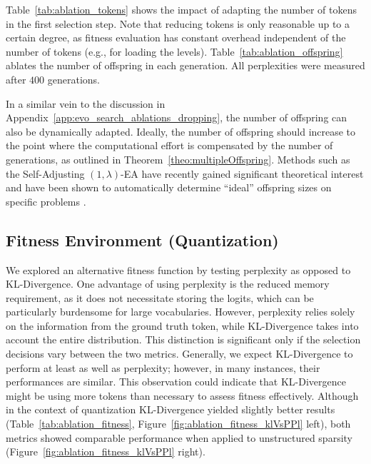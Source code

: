 Table~\ref{tab:ablation_tokens} shows the impact of adapting the number of tokens in the first selection step. Note that reducing tokens is only reasonable up to a certain degree, as fitness evaluation has constant overhead independent of the number of tokens (e.g., for loading the levels). Table~\ref{tab:ablation_offspring} ablates the number of offspring in each generation. All perplexities were measured after $400$ generations. 




In a similar vein to the discussion in Appendix~\ref{app:evo_search_ablations_dropping}, the number of offspring can also be dynamically adapted. Ideally, the number of offspring should increase to the point where the computational effort is compensated by the number of generations, as outlined in Theorem~\ref{theo:multipleOffspring}. Methods such as the Self-Adjusting $(1,\lambda)$-EA have recently gained significant theoretical interest and have been shown to automatically determine ``ideal'' offspring sizes on specific problems \citep{sudholt_self_adjusting, kaufmann_self_adjusting}.



\subsection{Fitness Environment (Quantization)}
\label{app:evo_search_ablations_quantization}

We explored an alternative fitness function by testing perplexity as opposed to KL-Divergence. One advantage of using perplexity is the reduced memory requirement, as it does not necessitate storing the logits, which can be particularly burdensome for large vocabularies. However, perplexity relies solely on the information from the ground truth token, while KL-Divergence takes into account the entire distribution. This distinction is significant only if the selection decisions vary between the two metrics. Generally, we expect KL-Divergence to perform at least as well as perplexity; however, in many instances, their performances are similar. This observation could indicate that KL-Divergence might be using more tokens than necessary to assess fitness effectively. Although in the context of quantization KL-Divergence yielded slightly better results (Table~\ref{tab:ablation_fitness}, Figure~\ref{fig:ablation_fitness_klVsPPl} left), both metrics showed comparable performance when applied to unstructured sparsity (Figure~\ref{fig:ablation_fitness_klVsPPl} right).

